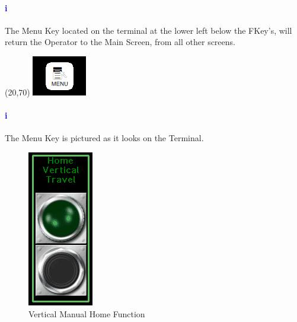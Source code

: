 \paragraph{\textbf{\LARGE \textcolor{blue}{i}}}
The Menu Key located on the terminal at the lower left below the FKey's, will return the Operator to the Main Screen, from all other screens.\\
\begin{minipage}{4cm}
	\begin{picture}(20,70)
	\includegraphics[width=.5\linewidth]{screen-captures/menu}
	\end{picture}
\end{minipage}\begin{minipage}[]{11cm}
	\paragraph{\textbf{\LARGE \textcolor{blue}{i}}} The Menu Key is pictured as it looks on the Terminal.
\end{minipage}
\begin{figure}
	\centering
	\includegraphics[width=.2\linewidth]{screen-captures/manual/vert-manual-home}
	\caption{Vertical Manual Home Function}
	\label{fig:vert-manual-home}
\end{figure}
